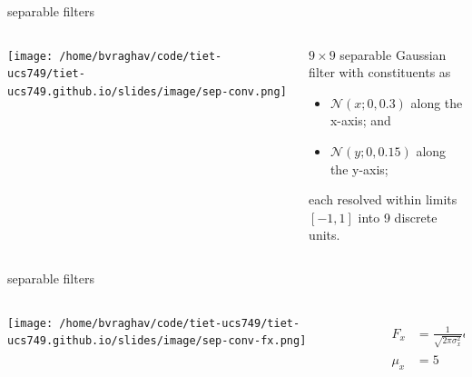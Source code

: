 \documentclass[aspectratio=169,xcolor={dvipsnames,svgnames}]{beamer}
\begin{document}
\begin{frame}[label={sec:separable-conv}]{separable filters}
\begin{columns}
\begin{column}{.5\columnwidth}
\begin{center}
\texttt{[image: /home/bvraghav/code/tiet-ucs749/tiet-ucs749.github.io/slides/image/sep-conv.png]}
\end{center}
\end{column}

\begin{column}{.5\columnwidth}
\(9\times 9\) separable Gaussian filter with constituents
as
\begin{itemize}
\item \(\mathcal{N}(x;0,0.3)\) along the x-axis; and
\item \(\mathcal{N}(y;0,0.15)\) along the y-axis;
\end{itemize}

each resolved within limits \([-1,1]\) into 9 discrete
units.
\end{column}
\end{columns}
\end{frame}

\begin{frame}[label={sec:orgb691388}]{separable filters}
\begin{columns}
\begin{column}{.5\columnwidth}
\begin{center}
\texttt{[image: /home/bvraghav/code/tiet-ucs749/tiet-ucs749.github.io/slides/image/sep-conv-fx.png]}
\end{center}
\end{column}

\begin{column}{.5\columnwidth}
\begin{align*}
  F_{x} &= \frac{1}{\sqrt{2\pi\sigma^2_x}}
          e^{-\frac{(x-\mu_x)^2}{2\sigma^2_x}}
  \\
  \mu_x &= 5 \qquad \sigma_x = \frac43
\end{align*}
\end{column}
\end{columns}
\end{frame}
\end{document}
